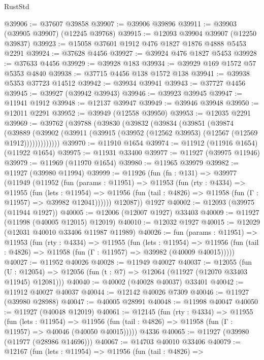 \begin{lexlean}{RustStd}
\begin{coremodule}
@39906 := @37607 @39858
@39907 := @39906 @39896
@39911 := @39903 (@39905 @39907) (@12245 @39768)
@39915 := @12093 @39904 @39907 (@12250 @39837)
@39923 := @15058 @37601 @1912 @476 @1827 @1876 @4888 @5453 @2291
@39924 := @37628 @4456
@39927 := @39924 @476 @1827 @5453
@39928 := @37633 @4456
@39929 := @39928 @183
@39934 := @39929 @169 @1572 @57 @5353 @4840
@39938 := @37715 @4456 @138 @1572 @138
@39941 := @39938 @5353 @37723 @14512
@39942 := @39934 @39941
@39943 := @37727 @4456
@39945 := @39927 (@39942 @39943)
@39946 := @39923 @39945
@39947 := @11941 @1912
@39948 := @12137 @39947
@39949 := @39946 @39948
@39950 := @12011 @2291
@39952 := @39949 (@12558 @39950)
@39953 := @12035 @2291
@39969 := @39762
    (@39788
      (@39830
        (@39832
          (@39834
            (@39851
              (@39874
                (@39889
                  (@39902 (@39911 (@39915 (@39952 (@12562 @39953) (@12567 (@12569 @1912)))))))))))))
@39970 := @11910 @1654
@39974 := @11912 (@11916 @1654) (@11922 @1654)
@39975 := @11931 @33400
@39977 := @11927 (@39975 @11946)
@39979 := @11969 (@11970 @1654)
@39980 := @11965 @39979
@39982 := @11927 (@39980 @11994)
@39999 := @11926
    (fun (fn : @131) =>
    @39977
      (@11949
        (@11952
          (fun (params : @11951) =>
          @11953
            (fun (rty : @4334) =>
            @11955
              (fun (lets : @11954) =>
              @11956 (fun (tail : @4826) => @11958 (fun (Γ : @11957) => @39982 @12041))))))
        @12087))
    @1927
@40002 := @12093 (@39975 (@11944 @1927))
@40005 := @12006 (@12007 @1927) @33403
@40009 := @11927 (@11998 (@40005 @12015) @12019)
@40010 := @12032 @1927
@40015 := @12029 (@12031 @40010 @33406 @11987 @11989)
@40026 := fun (params : @11951) =>
  @11953
    (fun (rty : @4334) =>
    @11955
      (fun (lets : @11954) =>
      @11956 (fun (tail : @4826) => @11958 (fun (Γ : @11957) => @39982 (@40009 @40015)))))
@40027 := @11952 @40026
@40028 := @11949 @40027
@40037 := @12055
    (fun (U : @12054) => @12056 (fun (t : @7) => @12064 (@11927 (@12070 @33403 @11945) @12081)))
@40040 := @40002 (@40028 @40037) @33401
@40042 := @11912 @40027 @40037
@40044 := @12142 @40026 @7309
@40046 := @11927 (@39980 @28988)
@40047 := @40005 @28991
@40048 := @11998 @40047
@40050 := @11927 (@40048 @12019)
@40061 := @12145
    (fun (rty : @4334) =>
    @11955
      (fun (lets : @11954) =>
      @11956 (fun (tail : @4826) => @11958 (fun (Γ : @11957) => @40046 (@40050 @40015)))))
    @4336
@40065 := @11927 (@39980 (@11977 (@28986 @14696)))
@40067 := @14703 @40010 @33406
@40079 := @12167
    (fun (lets : @11954) =>
    @11956
      (fun (tail : @4826) =>

\end{coremodule}
\end{lexlean}
